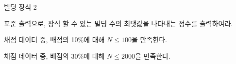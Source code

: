 \begin{problem}{빌딩 장식 2}
	
	\OutputFile
	
	표준 출력으로, 장식 할 수 있는 빌딩 수의 최댓값을 나타내는 정수를 출력하여라.
	
	\Scoring
	
	채점 데이터 중, 배점의 10\%에 대해 $N \le 100$을 만족한다.
	
	채점 데이터 중, 배점의 30\%에 대해 $N \le 2000$을 만족한다.
	
	\Examples
		
	\begin{example}
	\end{example}

	
\end{problem}


